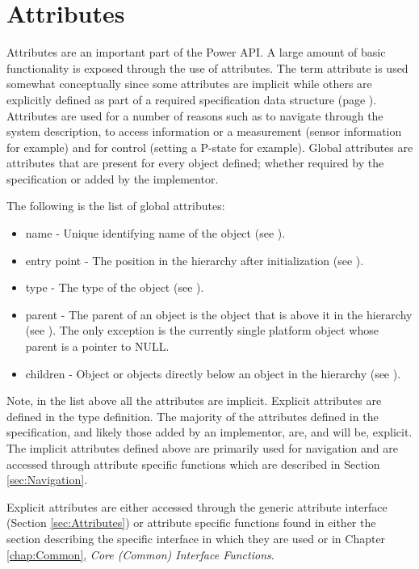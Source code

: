 \section{Attributes}\label{sec:TheoryAttributes}
Attributes are an important part of the Power API.
A large amount of basic functionality is exposed through the use of attributes.
The term attribute is used somewhat conceptually since some attributes are implicit while others are explicitly defined as part of a required specification data structure (page \pageref{type:AttrName}).
Attributes are used for a number of reasons such as to navigate through the system description, to access information or a measurement (sensor information for example) and for control (setting a P-state for example).
Global attributes are attributes that are present for every object defined; whether required by the specification or added by the implementor. 

The following is the list of global attributes:
\begin{itemize}[noitemsep,nolistsep] %
\item{name} - Unique identifying name of the object (see ).
\item{entry point} - The position in the hierarchy after initialization (see ).
\item{type} - The type of the object (see ).
\item{parent} - The parent of an object is the object that is above it in the hierarchy (see ).  The only exception is the currently single platform object whose parent is a pointer to NULL. 
\item{children} -  Object or objects directly below an object in the hierarchy (see ).
\end{itemize}

Note, in the list above all the attributes are implicit. 
Explicit attributes are defined in the  type definition.
The majority of the attributes defined in the specification, and likely those added by an implementor, are, and will be, explicit.
The implicit attributes defined above are primarily used for navigation and are accessed through attribute specific functions which are described in Section \ref{sec:Navigation}.

Explicit attributes are either accessed through the generic attribute interface (Section \ref{sec:Attributes}) or attribute specific functions found in either the section describing the specific interface in which they are used or in Chapter \ref{chap:Common}, \textit{Core (Common) Interface Functions}.


